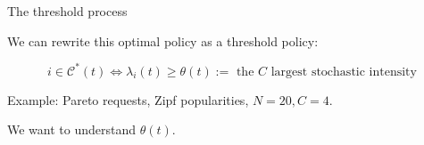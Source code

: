 \documentclass[aspectratio=169]{beamer}
\begin{document}
\begin{frame}{The threshold process}
	
	We can rewrite this optimal policy as a \alert{threshold} policy:

	\begin{equation*}
		i\in\mathcal{C}^*(t) \Leftrightarrow \lambda_i(t) \geqslant \theta(t) := \text{ the $C$ largest stochastic intensity}
	\end{equation*}

	\vfill
	\alert{Example:} Pareto requests, Zipf popularities, $N=20, C=4$.
	\begin{center}
		
	\end{center}

	\vfill

	We want to understand $\theta(t)$.
\end{frame}

	
\end{document}
